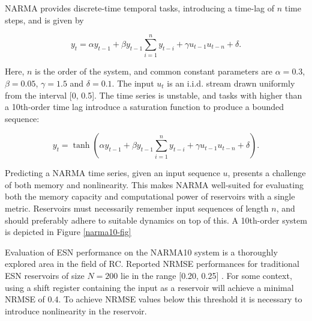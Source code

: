 NARMA provides discrete-time temporal tasks, introducing a time-lag of $n$ time
steps, and is given by

\begin{equation}
  y_{t} = \alpha y_{t-1} +
  \beta y_{t-1} \sum_{i=1}^{n}y_{t-i} +
  \gamma u_{t-1}u_{t-n} +
  \delta
  .
  \label{narma-eq}
\end{equation}

Here, $n$ is the order of the system, and common constant parameters are $\alpha
= 0.3$, $\beta = 0.05$, $\gamma = 1.5$ and $\delta = 0.1$. The input $u_{t}$ is
an i.i.d. stream drawn uniformly from the interval [0, 0.5]. The time series is
unstable, and tasks with higher than a 10th-order time lag introduce a
saturation function to produce a bounded sequence:

\begin{equation}
  y_{t} =
  \tanh(
  \alpha y_{t-1} +
  \beta y_{t-1} \sum_{i=1}^{n}y_{t-i} +
  \gamma u_{t-1}u_{t-n} +
  \delta
  )
  .
  \label{narma-tanh-eq}
\end{equation}

Predicting a NARMA time series, given an input sequence $u$, presents a
challenge of both memory and nonlinearity. This makes NARMA well-suited for
evaluating both the memory capacity and computational power of reservoirs with a
single metric. Reservoirs must necessarily remember input sequences of length
$n$, and should preferably adhere to suitable dynamics on top of this. A 10th-order system is depicted in Figure \ref{narma10-fig}

Evaluation of ESN performance on the NARMA10 system is a thoroughly explored
area in the field of RC. Reported NRMSE performances for traditional ESN
reservoirs of size $N = 200$ lie in the range [0.20, 0.25]
\cite{verstraeten_experimental_2007, goudarzi_comparative_2014,
rodan_minimum_2011, jaeger_adaptive_2003}. For some context, using a shift
register containing the input as a reservoir will achieve a minimal NRMSE of
0.4. To achieve NRMSE values below this threshold it is necessary to introduce
nonlinearity in the reservoir.

